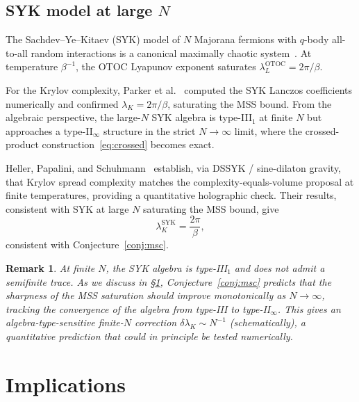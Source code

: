 \documentclass[12pt,a4paper]{article}
\newtheorem{remark}{Remark}
\begin{document}
\subsection{SYK model at large $N$}

The Sachdev--Ye--Kitaev (SYK) model of $N$ Majorana fermions with
$q$-body all-to-all random interactions is a canonical maximally chaotic
system~\cite{SYK_Kitaev}. At temperature $\beta^{-1}$, the OTOC
Lyapunov exponent saturates $\lambda_L^{\mathrm{OTOC}} = 2\pi/\beta$.

For the Krylov complexity, Parker et al.~\cite{Parker2019} computed
the SYK Lanczos coefficients numerically and confirmed
$\lambda_K = 2\pi/\beta$, saturating the MSS bound.
From the algebraic perspective, the large-$N$ SYK algebra is type-III$_1$
at finite $N$ but approaches a type-II$_\infty$ structure in the
strict $N \to \infty$ limit, where the crossed-product
construction~\eqref{eq:crossed} becomes exact.

Heller, Papalini, and Schuhmann~\cite{HellerPapalini2024} establish,
via DSSYK / sine-dilaton gravity, that Krylov spread complexity
matches the complexity-equals-volume proposal at finite temperatures,
providing a quantitative holographic check.
Their results, consistent with SYK at large $N$ saturating the MSS bound, give
\begin{equation}
  \lambda_K^{\mathrm{SYK}} = \frac{2\pi}{\beta},
  \label{eq:syk-krylov}
\end{equation}
consistent with Conjecture~\ref{conj:msc}.

\begin{remark}
At finite $N$, the SYK algebra is type-III$_1$ and does not admit a
semifinite trace.
As we discuss in \S\ref{sec:implications}, Conjecture~\ref{conj:msc}
predicts that the sharpness of the MSS saturation should improve
monotonically as $N \to \infty$, tracking the convergence of the
algebra from type-III to type-II$_\infty$.
This gives an algebra-type-sensitive finite-$N$ correction
$\delta\lambda_K \sim N^{-1}$ (schematically), a quantitative
prediction that could in principle be tested numerically.
\end{remark}

\section{Implications}
\label{sec:implications}
\end{document}
